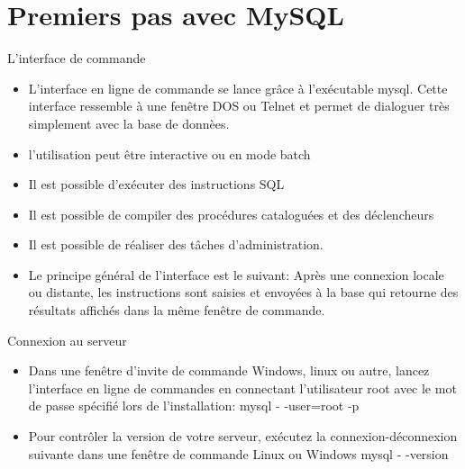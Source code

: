 \documentclass{beamer}
\begin{document}
\section{Premiers pas avec MySQL}
 \begin{frame}{L'interface de commande}
 \begin{itemize}
     \item L'interface en ligne de commande se lance gr\^ace \`a l'ex\'ecutable mysql. Cette interface ressemble \`a une fen\^etre DOS ou Telnet et permet de dialoguer tr\`es simplement avec la base de donn\`ees.
     \item l'utilisation peut \^etre interactive ou en mode batch
     \item Il est possible d'ex\'ecuter des instructions SQL
     \item Il est possible de compiler des proc\'edures catalogu\'ees et des d\'eclencheurs
     \item Il est possible de r\'ealiser des t\^aches d'administration.
     \item Le principe g\'en\'eral de l'interface est le suivant:
     \newline Apr\`es une connexion locale ou distante, les instructions sont saisies et envoy\'ees \`a la base qui retourne des r\'esultats affich\'es dans la m\^eme fen\^etre de commande.
 \end{itemize}
     
 \end{frame}
 \begin{frame}{Connexion au serveur}
 \begin{itemize}
     \item Dans une fen\^etre d'invite de commande Windows, linux ou autre, lancez l'interface en ligne de commandes en connectant l'utilisateur root avec le mot de passe sp\'ecifi\'e lors de l'installation:
     \newline mysql - -user=root  -p
     \item Pour contr\^oler la version de votre serveur, ex\'ecutez la connexion-d\'econnexion suivante dans une fen\^etre de commande Linux ou Windows
    \newline mysql - -version
    
 \end{itemize}
 \end{frame}
\end{document}
